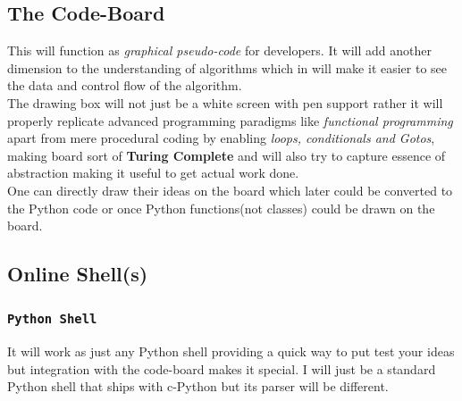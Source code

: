 \documentclass[letterpaper,10pt]{article}
\begin{document}
  		\subsection{The Code-Board}
  		This will function as \textit{graphical pseudo-code} for developers. It will add another dimension to the understanding of algorithms which in will make it easier to see the data and control flow of the algorithm.\\The drawing box will not just be a white screen with pen support rather it will properly replicate advanced programming paradigms like \textit{functional programming} apart from mere procedural coding by enabling \textit{loops, conditionals and Gotos}, making board sort of \textbf{Turing Complete} and will also try to capture essence of abstraction making it useful to get actual work done.\\One can directly draw their ideas on the board which later  could be converted to the Python code or once Python functions(not classes) could be drawn on the board. 
  		
  		\subsection{Online Shell(s)}
  		\subsubsection{\texttt{Python Shell}}
  		It will work as just any Python shell providing a quick way to put test your ideas but integration with the code-board makes it special. I will just be a standard Python shell that ships with c-Python but its parser will be different. 
\end{document}
